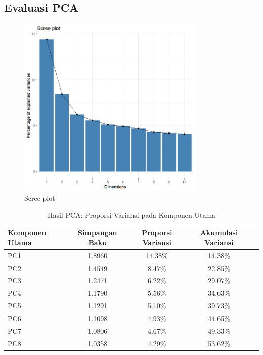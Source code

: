 \subsection{Evaluasi PCA}
\begin{figure}[!htpb]
    \centering
    \includegraphics[width=0.8\textwidth]{figures/screeplot.png}
    \caption{Scree plot}
    \label{fig:screeplot}
\end{figure}
\begin{table}[!htpb]
    \centering
    \caption{Hasil PCA: Proporsi Variansi pada Komponen Utama}
    \label{tab:pca-variance}
    \begin{tabular}{lcccc}
        \hline
        \textbf{Komponen Utama} & \textbf{Simpangan Baku} & \textbf{Proporsi Variansi} & \textbf{Akumulasi Variansi} \\
        \hline
        PC1 & 1.8960 & 14.38\% & 14.38\% \\
        PC2 & 1.4549 & 8.47\% & 22.85\% \\
        PC3 & 1.2471 & 6.22\% & 29.07\% \\
        PC4 & 1.1790 & 5.56\% & 34.63\% \\
        PC5 & 1.1291 & 5.10\% & 39.73\% \\
        PC6 & 1.1098 & 4.93\% & 44.65\% \\
        PC7 & 1.0806 & 4.67\% & 49.33\% \\
        PC8 & 1.0358 & 4.29\% & 53.62\% \\
        \hline
    \end{tabular}
\end{table}

